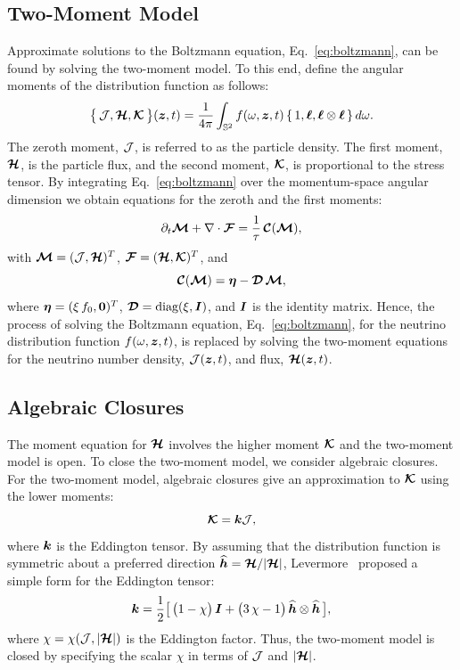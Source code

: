 \subsection{Two-Moment Model}

Approximate solutions to the Boltzmann equation, Eq.~\eqref{eq:boltzmann}, can be found by solving the two-moment model.
To this end, define the angular moments of the distribution function as follows:
\begin{equation}
  \big\{\,\mathcal{J},\boldsymbol{\mathcal{H}},\boldsymbol{\mathcal{K}}\,\big\}(\boldsymbol{z},t)
  =\frac{1}{4\pi}\int_{\mathbb{S}^{2}}f(\omega,\boldsymbol{z},t)\,\{\,1,\boldsymbol{\ell},\boldsymbol{\ell}\otimes\boldsymbol{\ell}\,\}\,d\omega.
  \label{eq:angularMoments}
\end{equation}  
The zeroth moment, $\mathcal{J}$, is referred to as the particle density.  
The first moment, $\boldsymbol{\mathcal{H}}$, is the particle flux, and the second moment, $\boldsymbol{\mathcal{K}}$, is proportional to the stress tensor.  
By integrating Eq.~\eqref{eq:boltzmann} over the momentum-space angular dimension we obtain equations for the zeroth and the first moments:
\begin{equation}
  \partial_{t}{\boldsymbol{\mathcal{M}}}+\nabla\cdot\boldsymbol{\mathcal{F}}=\frac{1}{\tau}\,\boldsymbol{\mathcal{C}}(\boldsymbol{\mathcal{M}}),
  \label{eq:momentEquations}
\end{equation}
with $\boldsymbol{\mathcal{M}}=(\mathcal{J},\boldsymbol{\mathcal{H}})^{T}$, $\boldsymbol{\mathcal{F}}=(\boldsymbol{\mathcal{H}},\boldsymbol{\mathcal{K}})^{T}$, and
\begin{equation}
  \boldsymbol{\mathcal{C}}(\boldsymbol{\mathcal{M}})=\boldsymbol{\eta}-\boldsymbol{\mathcal{D}}\,\boldsymbol{\mathcal{M}},
  \label{eq:collisionTermMoments}
\end{equation}
where $\boldsymbol{\eta}=(\xi\,f_{0},\boldsymbol{0})^{T}$, $\boldsymbol{\mathcal{D}}=\mbox{diag}(\xi,\boldsymbol{I})$, and
$\boldsymbol{I}$ is the identity matrix.
Hence, the process of solving the Boltzmann equation, Eq.~\eqref{eq:boltzmann}, for the neutrino distribution function $f(\omega,\boldsymbol{z},t)$, is replaced by solving the two-moment equations for the neutrino number density, $\mathcal{J}(\boldsymbol{z},t)$, and flux, $\boldsymbol{\mathcal{H}}(\boldsymbol{z},t)$.  

\subsection{Algebraic Closures}

The moment equation for $\boldsymbol{\mathcal{H}}$ involves the higher moment $\boldsymbol{\mathcal{K}}$ and the two-moment model is open.  
To close the two-moment model, we consider algebraic closures.  
For the two-moment model, algebraic closures give an approximation to $\boldsymbol{\mathcal{K}}$ using the lower moments:
\begin{equation}
  \boldsymbol{\mathcal{K}} = \boldsymbol{k} \mathcal{J},
\end{equation}
where $\boldsymbol{k}$ is the Eddington tensor.  
By assuming that the distribution function is symmetric about a preferred direction $\widehat{\boldsymbol{h}}=\boldsymbol{\mathcal{H}}/|\boldsymbol{\mathcal{H}}|$, Levermore~\cite{levermore_1984} proposed a simple form for the Eddington tensor:
\begin{equation}
  \boldsymbol{k}=\frac{1}{2}\big[\,\big(1-\chi\big)\,\boldsymbol{I}+\big(3\,\chi-1\big)\,\widehat{\boldsymbol{h}}\otimes\widehat{\boldsymbol{h}}\,\big],
  \label{eq:eddingtonTensor}
\end{equation}
where $\chi=\chi(\mathcal{J},|\boldsymbol{\mathcal{H}}|)$ is the Eddington factor.  
Thus, the two-moment model is closed by specifying the scalar $\chi$ in terms of $\mathcal{J}$ and $|\boldsymbol{\mathcal{H}}|$.  

